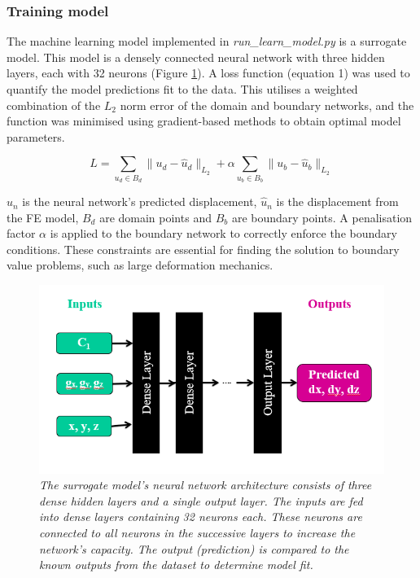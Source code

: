 \documentclass[11pt]{article}
\begin{document}
\subsubsection{Training model}
The machine learning model implemented in \textit{run\_learn\_model.py} is a surrogate model. This model is a densely connected neural network with three hidden layers, each with 32 neurons (Figure \ref{fig1}). A loss function (equation 1) was used to quantify the model predictions fit to the data. This utilises a weighted combination of the $L_{2}$ norm error of the domain and boundary networks, and the function was minimised using gradient-based methods to obtain optimal model parameters.

\begin{equation}
    L = \sum_{u_{d}\in B_{d}}\|u_{d}-\hat{u}_{d}\|_{L_{2}} + \alpha\sum_{u_{b}\in B_{b}}\|u_{b}-\hat{u}_{b}\|_{L_{2}}
\end{equation}

$u_{n}$ is the neural network's predicted displacement, $\hat{u}_{n}$ is the displacement from the FE model, $B_{d}$ are domain points and $B_{b}$ are boundary points. A penalisation factor $\alpha$ is applied to the boundary network to correctly enforce the boundary conditions. These constraints are essential for finding the solution to boundary value problems, such as large deformation mechanics.

\begin{figure}[H]
    \centering
    \includegraphics[scale=0.75]{Images/breast/surrogate_network.png}
    \caption{\textit{\label{fig1}The surrogate model's neural network architecture consists of three dense hidden layers and a single output layer. The inputs are fed into dense layers containing 32 neurons each. These neurons are connected to all neurons in the successive layers to increase the network's capacity. The output (prediction) is compared to the known outputs from the dataset to determine model fit.}}
\end{figure}
\end{document}
